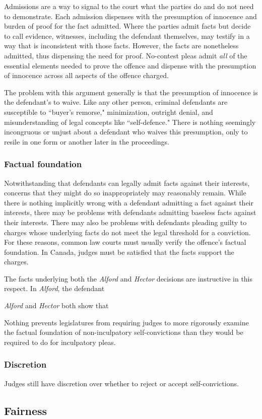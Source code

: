 Admissions are a way to signal to the court what the parties do and do not need to demonstrate. Each admission dispenses with the presumption of innocence and burden of proof for the fact admitted. Where the parties admit facts but decide to call evidence, witnesses, including the defendant themselves, may testify in a way that is inconsistent with those facts. However, the facts are nonetheless admitted, thus dispensing the need for proof. No-contest pleas admit \textit{all} of the essential elements needed to prove the offence and dispense with the presumption of innocence across all aspects of the offence charged.

The problem with this argument generally is that the presumption of innocence is the defendant's to waive. Like any other person, criminal defendants are susceptible to ``buyer's remorse," minimization, outright denial, and misunderstanding of legal concepts like ``self-defence." There is nothing seemingly incongruous or unjust about a defendant who waives this presumption, only to resile in one form or another later in the proceedings.

\subsubsection{Factual foundation}

Notwithstanding that defendants can legally admit facts against their interests, concerns that they might do so inappropriately may reasonably remain. While there is nothing implicitly wrong with a defendant admitting a fact against their interests, there may be problems with defendants admitting baseless facts against their interests. There may also be problems with defendants pleading guilty to charges whose underlying facts do not meet the legal threshold for a conviction. For these reasons, common law courts must usually verify the offence's factual foundation. In Canada, judges must be satisfied that the facts support the charges.

The facts underlying both the \textit{Alford} and \textit{Hector} decisions are instructive in this respect. In \textit{Alford}, the defendant 

\textit{Alford} and \textit{Hector} both show that 

Nothing prevents legislatures from requiring judges to more rigorously examine the factual foundation of non-inculpatory self-convictions than they would be required to do for inculpatory pleas. 

\subsubsection{Discretion}

Judges still have discretion over whether to reject or accept self-convictions.

\subsection{Fairness}